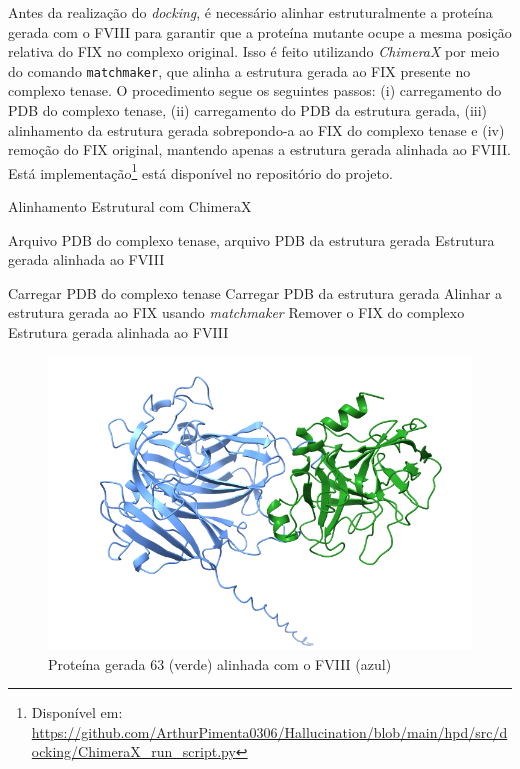Antes da realização do \textit{docking}, é necessário alinhar estruturalmente a proteína gerada com o FVIII
para garantir que a proteína mutante ocupe a mesma posição relativa do FIX no complexo original. 
Isso é feito utilizando \textit{ChimeraX} \cite{ChimeraX} por meio do comando \texttt{matchmaker}, 
que alinha a estrutura gerada ao FIX presente no complexo tenase. 
O procedimento segue os seguintes passos: (i) carregamento do PDB do complexo tenase, 
(ii) carregamento do PDB da estrutura gerada, (iii) alinhamento da estrutura gerada sobrepondo-a ao FIX do complexo tenase 
e (iv) remoção do FIX original, mantendo apenas a estrutura gerada alinhada ao FVIII.
Está implementação\footnote{Disponível em: \url{https://github.com/ArthurPimenta0306/Hallucination/blob/main/hpd/src/docking/ChimeraX_run_script.py}} está disponível
no repositório do projeto.

\begin{algorithm}
  \caption{Alinhamento Estrutural com ChimeraX}
  \label{alg:alignment_chimerax}
  \begin{algorithmic}[1]
  \Require Arquivo PDB do complexo tenase, arquivo PDB da estrutura gerada
  \Ensure Estrutura gerada alinhada ao FVIII

  \State Carregar PDB do complexo tenase
  \State Carregar PDB da estrutura gerada
  \State Alinhar a estrutura gerada ao FIX usando \textit{matchmaker}
  \State Remover o FIX do complexo
  \State \Return Estrutura gerada alinhada ao FVIII
  \end{algorithmic}
\end{algorithm}


\begin{figure}[H]
  \centering
  \includegraphics[width=.6\textwidth]{figuras/complexocomid63.png}
  \caption{Proteína gerada 63 (verde) alinhada com o FVIII (azul)}
\end{figure}

